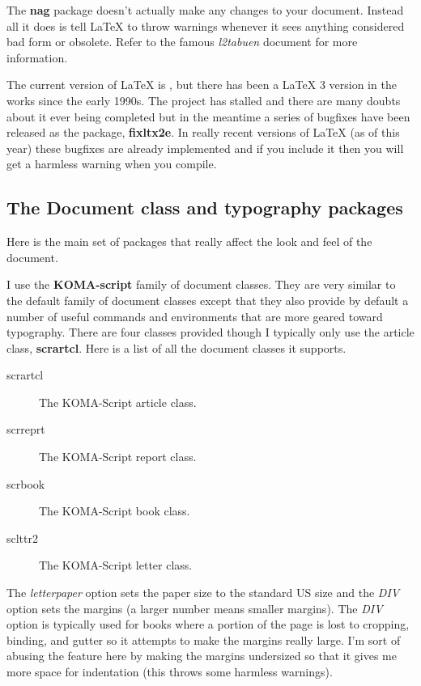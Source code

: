       The \textbf{nag} package doesn't actually make any changes to your document. Instead all it does is tell \LaTeX{} to throw warnings whenever it sees anything considered bad form or obsolete. Refer to the famous \textit{l2tabuen} document for more information.

      The current version of \LaTeX{} is \LaTeXe, but there has been a \LaTeX{} 3 version in the works since the early 1990s. The project has stalled and there are many doubts about it ever being completed but in the meantime a series of bugfixes have been released as the package, \textbf{fixltx2e}. In really recent versions of \LaTeX{} (as of this year) these bugfixes are already implemented and if you include it then you will get a harmless warning when you compile.

    \subsection{The Document class and typography packages}
      Here is the main set of packages that really affect the look and feel of the document.

      I use the \textbf{KOMA-script} family of document classes. They are very similar to the default family of document classes except that they also provide by default a number of useful commands and environments that are more geared toward typography. There are four classes provided though I typically only use the article class, \textbf{scrartcl}. Here is a list of all the document classes it supports.

      \begin{addmargin}{1cm}
        \begin{description}
          \item[scrartcl] The KOMA-Script article class.
          \item[scrreprt] The KOMA-Script report class.
          \item[scrbook] The KOMA-Script book class.
          \item[sclttr2] The KOMA-Script letter class.
        \end{description} 
      \end{addmargin}

      The \textit{letterpaper} option sets the paper size to the standard US size and the \textit{DIV} option sets the margins (a larger number means smaller margins). The \textit{DIV} option is typically used for books where a portion of the page is lost to cropping, binding, and gutter so it attempts to make the margins really large. I'm sort of abusing the feature here by making the margins undersized so that it gives me more space for indentation (this throws some harmless warnings).

